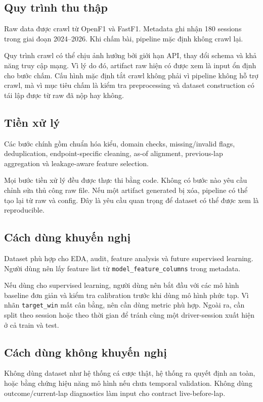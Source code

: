 \documentclass[conference]{IEEEtran}
\begin{document}
\subsection{Quy trình thu thập}
Raw data được crawl từ OpenF1 và FastF1. Metadata ghi nhận 180 sessions trong giai đoạn 2024--2026. Khi chấm bài, pipeline mặc định không crawl lại.

Quy trình crawl có thể chịu ảnh hưởng bởi giới hạn API, thay đổi schema và khả năng truy cập mạng. Vì lý do đó, artifact raw hiện có được xem là input ổn định cho bước chấm. Cấu hình mặc định tắt crawl không phải vì pipeline không hỗ trợ crawl, mà vì mục tiêu chấm là kiểm tra preprocessing và dataset construction có tái lập được từ raw đã nộp hay không.

\subsection{Tiền xử lý}
Các bước chính gồm chuẩn hóa kiểu, domain checks, missing/invalid flags, deduplication, endpoint-specific cleaning, as-of alignment, previous-lap aggregation và leakage-aware feature selection.

Mọi bước tiền xử lý đều được thực thi bằng code. Không có bước nào yêu cầu chỉnh sửa thủ công raw file. Nếu một artifact generated bị xóa, pipeline có thể tạo lại từ raw và config. Đây là yêu cầu quan trọng để dataset có thể được xem là reproducible.

\subsection{Cách dùng khuyến nghị}
Dataset phù hợp cho EDA, audit, feature analysis và future supervised learning. Người dùng nên lấy feature list từ \texttt{model\_feature\_columns} trong metadata.

Nếu dùng cho supervised learning, người dùng nên bắt đầu với các mô hình baseline đơn giản và kiểm tra calibration trước khi dùng mô hình phức tạp. Vì nhãn \texttt{target\_win} mất cân bằng, nên cần dùng metric phù hợp. Ngoài ra, cần split theo session hoặc theo thời gian để tránh cùng một driver-session xuất hiện ở cả train và test.

\subsection{Cách dùng không khuyến nghị}
Không dùng dataset như hệ thống cá cược thật, hệ thống ra quyết định an toàn, hoặc bằng chứng hiệu năng mô hình nếu chưa temporal validation. Không dùng outcome/current-lap diagnostics làm input cho contract live-before-lap.
\end{document}
